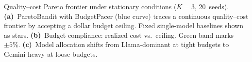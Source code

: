 Quality--cost Pareto frontier under stationary conditions ($K{=}3$, 20~seeds). \textbf{(a)}~ParetoBandit with BudgetPacer (blue curve) traces a continuous quality--cost frontier by accepting a dollar budget ceiling. Fixed single-model baselines shown as stars. \textbf{(b)}~Budget compliance: realized cost vs.\ ceiling. Green band marks $\pm5\%$. \textbf{(c)}~Model allocation shifts from Llama-dominant at tight budgets to Gemini-heavy at loose budgets.
